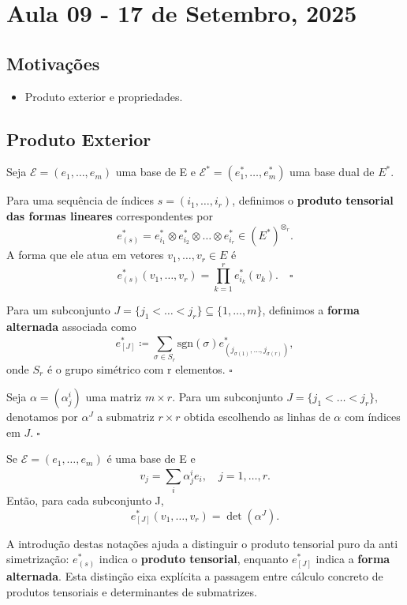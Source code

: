 \documentclass[../differential_forms.tex]{subfiles}
\begin{document}
\section{Aula 09 - 17 de Setembro, 2025}
\subsection{Motivações}
\begin{itemize}
	\item Produto exterior e propriedades.
\end{itemize}
\subsection{Produto Exterior}
Seja \(\mathcal{E}=(e_1,\dotsc , e_{m})\) uma base de E e \(\mathcal{E}^{*} = (e_{1}^{*}, \dotsc , e_{m}^{*})\) uma base dual de \(E^{*}.\)
\begin{def*}
	Para uma sequência de índices \(s=(i_1,\dotsc ,i_r)\), definimos o \textbf{produto tensorial das formas lineares} correspondentes por
	\[
		e_{(s)}^{*} = e_{i_1}^{*}\otimes e_{i_2}^{*}\otimes \dotsc \otimes e_{i_r}^{*}\in (E^{*})^{\otimes_r}.
	\]
	A forma que ele atua em vetores \(v_1,\dotsc ,v_r\in E\) é
	\[
		e_{(s)}^{*} (v_1,\dotsc ,v_r) = \prod\limits_{k=1}^{r}e_{i_k}^{*}(v_{k}). \quad \square
	\]
\end{def*}
\begin{def*}
	Para um subconjunto \(J=\{j_1<\dotsc <j_r\}\subseteq \{1,\dotsc ,m\}\), definimos a \textbf{forma alternada} associada como
	\[
		e_{[J]}^{*} \coloneqq \sum\limits_{\sigma \in S_{r}}^{} \mathrm{sgn}(\sigma )e_{(j_{\sigma (1)}, \dotsc , j_{\sigma (r)})}^{*},
	\]
	onde \(S_r\) é o grupo simétrico com r elementos. \(\square\)
\end{def*}
\begin{def*}
	Seja \(\alpha = (\alpha_{j}^{i})\) uma matriz \(m\times r\). Para um subconjunto \(J=\{j_1<\dotsc <j_r\},\) denotamos por \(\alpha^{J}\) a submatriz \(r\times r\) obtida escolhendo as linhas de \(\alpha \) com índices em \(J.\; \square\)
\end{def*}
\begin{prop*}
	Se \(\mathcal{E}=(e_1,\dotsc , e_{m})\) é uma base de E e
	\[
		v_{j} = \sum\limits_{i}^{}\alpha_{j}^{i}e_{i},\quad j=1,\dotsc ,r.
	\]
	Então, para cada subconjunto J,
	\[
		e_{[J]}^{*}(v_1,\dotsc , v_r) = \det{(\alpha^{J})}.
	\]
\end{prop*}
\begin{tcolorbox}[
		skin=enhanced,
		title=Observação,
		fonttitle=\bfseries,
		colframe=black,
		colbacktitle=cyan!75!white,
		colback=cyan!15,
		colbacklower=black,
		coltitle=black,
		drop fuzzy shadow,
	]
	A introdução destas notações ajuda a distinguir o produto tensorial puro da anti simetrização:  \(e_{(s)}^{*}\) indica o \textbf{produto tensorial}, enquanto \(e_{[J]}^{*}\) indica a \textbf{forma alternada}. Esta distinção eixa explícita a passagem entre cálculo concreto de produtos tensoriais e determinantes de submatrizes.
\end{tcolorbox}
\end{document}
